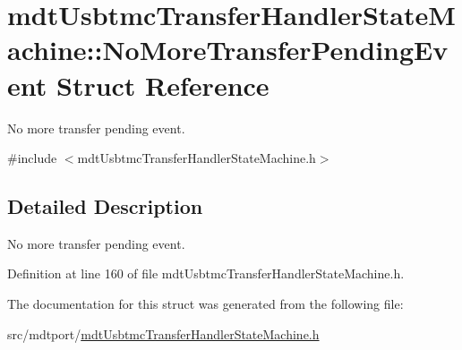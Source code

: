 \hypertarget{structmdt_usbtmc_transfer_handler_state_machine_1_1_no_more_transfer_pending_event}{\section{mdt\-Usbtmc\-Transfer\-Handler\-State\-Machine\-:\-:No\-More\-Transfer\-Pending\-Event Struct Reference}
\label{structmdt_usbtmc_transfer_handler_state_machine_1_1_no_more_transfer_pending_event}
}


No more transfer pending event.  




{\ttfamily \#include $<$mdt\-Usbtmc\-Transfer\-Handler\-State\-Machine.\-h$>$}



\subsection{Detailed Description}
No more transfer pending event. 

Definition at line 160 of file mdt\-Usbtmc\-Transfer\-Handler\-State\-Machine.\-h.



The documentation for this struct was generated from the following file\-:\begin{DoxyCompactItemize}
\item 
src/mdtport/\hyperlink{mdt_usbtmc_transfer_handler_state_machine_8h}{mdt\-Usbtmc\-Transfer\-Handler\-State\-Machine.\-h}\end{DoxyCompactItemize}
